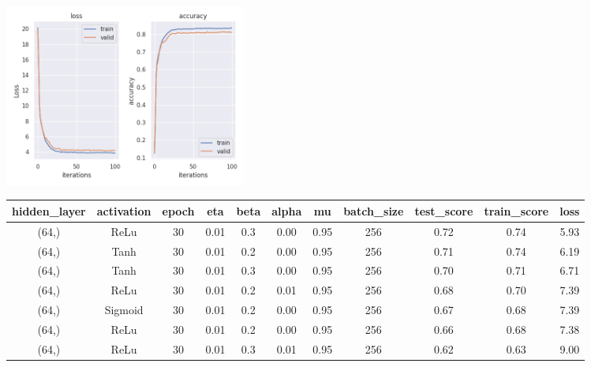 \documentclass[10pt]{SelfArx} %
\begin{document}
	\begin{center}\centering
		\includegraphics[width=\linewidth,height=6cm]{img/satlog-plots2}
	\end{center}
	
	\begin{table}[hbt]\centering
		\begin{tabular*}{1\textwidth}{@{\extracolsep{\fill} }ccccccccccc@{}}
			\toprule
			hidden\_layer & activation & epoch & eta & beta & alpha & mu & batch\_size & test\_score & train\_score & loss \\ \midrule
			(64,) & ReLu & 30 & 0.01 & 0.3 & 0.00 & 0.95 & 256 & 0.72 & 0.74 & 5.93 \\
			(64,) & Tanh & 30 & 0.01 & 0.2 & 0.00 & 0.95 & 256 & 0.71 & 0.74 & 6.19 \\
			(64,) & Tanh & 30 & 0.01 & 0.3 & 0.00 & 0.95 & 256 & 0.70 & 0.71 & 6.71 \\
			(64,) & ReLu & 30 & 0.01 & 0.2 & 0.01 & 0.95 & 256 & 0.68 & 0.70 & 7.39 \\
			(64,) & Sigmoid & 30 & 0.01 & 0.2 & 0.00 & 0.95 & 256 & 0.67 & 0.68 & 7.39 \\
			(64,) & ReLu & 30 & 0.01 & 0.2 & 0.00 & 0.95 & 256 & 0.66 & 0.68 & 7.38 \\
			(64,) & ReLu & 30 & 0.01 & 0.3 & 0.01 & 0.95 & 256 & 0.62 & 0.63 & 9.00 \\ \bottomrule
		\end{tabular*}
		\label{tsatlog}
	\end{table}
	
\end{document}

